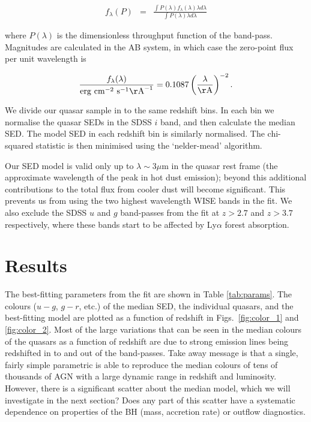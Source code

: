 \begin{eqnarray}
  \label{eq:flux}
  f_{\lambda}(P) & = & \frac{\int P(\lambda) f_\lambda(\lambda) \lambda d\lambda }{\int P(\lambda) \lambda d\lambda}
\end{eqnarray}

where $P(\lambda)$ is the dimensionless throughput function of the band-pass. 
Magnitudes are calculated in the AB system, in which case the zero-point flux per unit wavelength is 

\begin{eqnarray}
  \frac{f_\lambda(\lambda)}{{\rm erg}~{\rm cm}^{-2}~{\rm s}^{-1} {\rm\AA}^{-1}} = 0.1087 \left(\frac{\lambda}{\rm \AA}\right)^{-2}.
\end{eqnarray}

We divide our quasar sample in to the same redshift bins.
In each bin we normalise the quasar \ac{SED}s in the SDSS $i$ band, and then calculate the median \ac{SED}. 
The model \ac{SED} in each redshift bin is similarly normalised. 
The chi-squared statistic is then minimised using the `nelder-mead' algorithm. 

Our \ac{SED} model is valid only up to $\lambda \sim 3\mu$m in the quasar rest frame (the approximate wavelength of the peak in hot dust emission); beyond this additional contributions to the total flux from cooler dust will become significant. 
This prevents us from using the two highest wavelength WISE bands in the fit. 
We also exclude the SDSS $u$ and $g$ band-passes from the fit at $z > 2.7$ and $z > 3.7$ respectively, where these bands start to be affected by Ly$\alpha$ forest absorption.

\section{Results}

The best-fitting parameters from the fit are shown in Table \ref{tab:params}. 
The colours ($u - g$, $g - r$, etc.) of the median SED, the individual quasars, and the best-fitting model are plotted as a function of redshift in Figs.~\ref{fig:color_1} and \ref{fig:color_2}.
Most of the large variations that can be seen in the median colours of the quasars as a function of redshift are due to strong emission lines being redshifted in to and out of the band-passes.
Take away message is that a single, fairly simple parametric is able to reproduce the median colours of tens of thousands of \ac{AGN} with a large dynamic range in redshift and luminosity. 
However, there is a significant scatter about the median model, which we will investigate in the next section?
Does any part of this scatter have a systematic dependence on properties of the BH (mass, accretion rate) or outflow diagnostics.  

